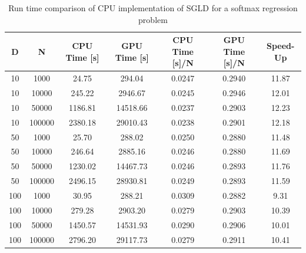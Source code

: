 \documentclass[9pt,lineno]{crone}
\begin{document}
\begin{table}[h]
	\centering
	\begin{tabular}{|c|c|c|c|c|c|c|}
		\hline 
		D & N & CPU Time [s] & GPU Time [s] & CPU Time [s]/N & GPU Time [s]/N & Speed-Up\\ 
		\hline 		
10	& 1000& 	24.75& 294.04  & 0.0247& 0.2940& 11.87\\
10	& 10000& 	245.22& 2946.67	& 0.0245& 0.2946& 12.01\\
10	& 50000& 	1186.81& 14518.66 & 0.0237& 0.2903& 12.23\\
10	& 100000	& 2380.18& 29010.43	& 0.0238& 0.2901& 12.18\\
\hline
50	& 1000	& 25.70& 288.02	& 0.0250& 0.2880& 11.48\\
50	& 10000	& 246.64& 2885.16	& 0.0246& 0.2880& 11.69\\
50	& 50000	& 1230.02& 14467.73	& 0.0246& 0.2893& 11.76\\
50 & 	100000	& 2496.15& 28930.81	& 0.0249& 0.2893& 11.59\\
\hline
100	& 1000	& 30.95& 288.21	& 0.0309& 0.2882& 9.31\\
100	& 10000	& 279.28& 2903.20& 0.0279& 0.2903& 10.39\\
100	& 50000	& 1450.57& 14531.93& 0.0290& 0.2906& 10.01\\
100	& 100000& 	2796.20& 29117.73& 0.0279& 0.2911& 10.41\\

		\hline 
\end{tabular}
\caption{Run time comparison of CPU implementation of SGLD for a softmax regression problem}
\label{tab:sgld} 
\end{table}


\end{document}
